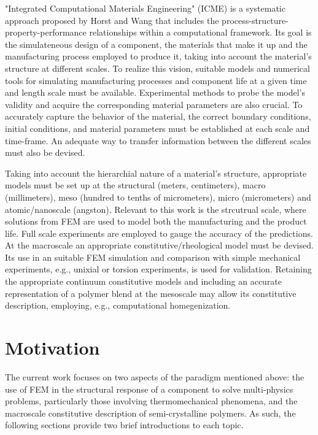 "Integrated Computational Materials Engineering" (ICME) is a systematic approach proposed by Horst and Wang \citep{horstemeyerCradletograveSimulationbasedDesign2003} that includes the process-structure-property-performance relationships within a computational framework.
Its goal is the simulateneous design of a component, the materials that make it up and the manufacturing process employed to produce it, taking into account the material's structure at different scales.
To realize this vision, suitable models and numerical tools for simulating manufacturing processes and component life at a given time and length scale must be available.
Experimental methods to probe the model's validity and acquire the corresponding material parameters are also crucial.
To accurately capture the behavior of the material, the correct boundary conditions, initial conditions, and material parameters must be established at each scale and time-frame.
An adequate way to transfer information between the different scales must also be devised.

Taking into account the hierarchial nature of a material's structure, appropriate models must be set up at the structural (meters, centimeters), macro (millimeters), meso (hundred to tenths of micrometers), micro (micrometers) and atomic/nanoscale (angston).
Relevant to this work is the strcutrual scale, where solutions from FEM are used to model both the manufacturing and the product life.
Full scale experiments are employed to gauge the accuracy of the predictions.
At the macroscale an appropriate constitutive/rheological model must be devised.
Its use in an suitable FEM simulation and comparison with simple mechanical experiments, e.g., unixial or torsion experiments, is used for validation.
Retaining the appropriate continuum constitutive models and including an accurate representation of a polymer blend at the mesoscale may allow its constitutive description, employing, e.g., computational homegenization.

\section{Motivation}

The current work focuses on two aspects of the paradigm mentioned above: the use of FEM in the structural response of a component to solve multi-physics problems, particularly those involving thermomechanical phenomena, and the macroscale constitutive description of semi-crystalline polymers.
As such, the following sections provide two brief introductions to each topic.

